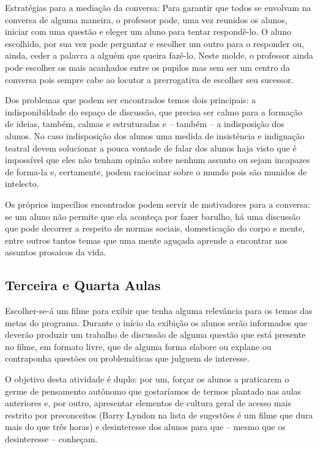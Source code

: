\documentclass[12pt,a4paper]{article}
\begin{document}
	Estratégias para a mediação da conversa: Para garantir que todos 
	se envolvam na conversa de alguma maneira, o professor pode, uma 
	vez reunidos os alunos, iniciar com uma questão e eleger um aluno 
	para tentar respondê-lo. O aluno escolhido, por sua vez pode 
	perguntar e escolher um outro para o responder ou, ainda, ceder a 
	palavra a alguém que queira fazê-lo. Neste molde, o professor 
	ainda pode escolher os mais acanhados entre os pupilos mas sem 
	ser um centro da conversa pois sempre cabe ao locutor a 
	prerrogativa de escolher seu sucessor.
	
	Dos problemas que podem ser encontrados temos dois principais:
	a indisponibildade do espaço de discussão, que precisa ser calmo 
	para a formação de ideias, também, calmas e estruturadas e -- 
	também -- a indisposição dos alunos. No caso indisposição dos 
	alunos uma medida de insistência e indignação teatral devem 
	solucionar a pouca vontade de falar dos alunos haja visto que é 
	impossível que eles não tenham opinão sobre nenhum assunto ou 
	sejam incapazes de forma-la e, certamente, podem raciocinar sobre 
	o mundo pois são munidos de intelecto.

	Os próprios impecílios encontrados podem servir de motivadores 
	para a conversa: se um aluno não permite que ela aconteça por 
	fazer barulho, há uma discussão que pode decorrer a respeito 
	de normas sociais, domesticação do corpo e mente, entre outros 
	tantos temas que uma mente aguçada aprende a encontrar nos 
	assuntos prosaicos da vida.

	\subsection*{Terceira e Quarta Aulas}
	
	Escolher-se-á um filme para exibir que tenha alguma relevância 
	para os temas das metas do programa. Durante o início da 
	exibição os alunos serão informados que deverão produzir um 
	trabalho de discussão de alguma questão que está presente no 
	filme, em formato livre, que de alguma forma elabore ou 
	explane ou contraponha questões ou problemáticas que julguem
	de interesse. 

	O objetivo desta atividade é duplo: por um, forçar os alunos 
	a praticarem o germe de pensamento autônomo que gostaríamos 
	de termos plantado nas aulas anteriores e, por outro, apresentar
	elementos de cultura geral de acesso mais restrito por 
	preconceitos (Barry Lyndon na lista de sugestões é um filme 
	que dura mais do que três horas) e desinteresse dos alunos para 
	que -- mesmo que os desinteresse -- conheçam.
\end{document}

